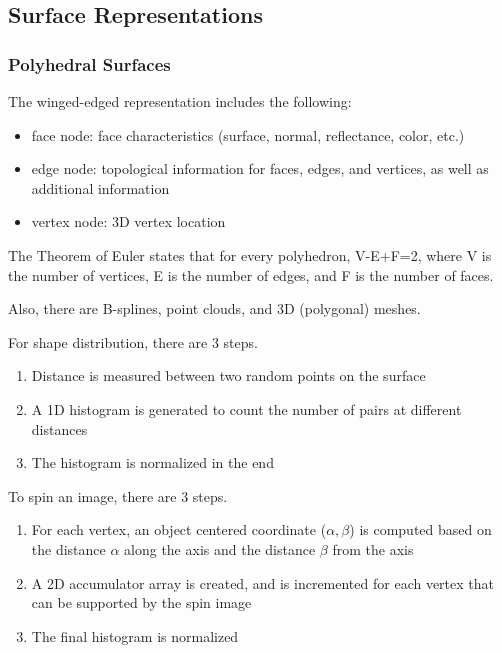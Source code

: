 \documentclass{article}
\begin{document}
\begin{multicols}{2}
\subsection{Surface Representations}
\subsubsection{Polyhedral Surfaces}

The winged-edged representation includes the following:

\begin{itemize}
  \item {face node: face characteristics (surface, normal, reflectance, color, etc.)}
  \item {edge node: topological information for faces, edges, and vertices, as well as additional information}
  \item {vertex node: 3D vertex location}
\end{itemize}

The Theorem of Euler states that for every polyhedron, V-E+F=2, where V is the number of vertices, E is the number of edges, and F is the number of faces.

Also, there are B-splines, point clouds, and 3D (polygonal) meshes.

\vspace{2mm}

For shape distribution, there are 3 steps.
\begin{enumerate}
  \item {Distance is measured between two random points on the surface}
  \item {A 1D histogram is generated to count the number of pairs at different distances}
  \item {The histogram is normalized in the end}
\end{enumerate}

To spin an image, there are 3 steps.
\begin{enumerate}
  \item {For each vertex, an object centered coordinate ($\alpha, \beta$) is computed based on the distance $\alpha$ along the axis and the distance $\beta$ from the axis}
  \item {A 2D accumulator array is created, and is incremented for each vertex that can be supported by the spin image}
  \item {The final histogram is normalized}
\end{enumerate}


\end{multicols}
\end{document}
